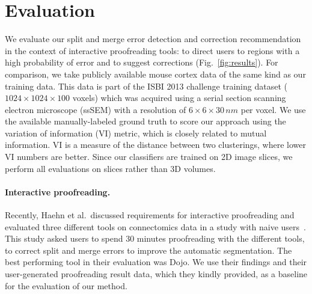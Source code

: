 \section{Evaluation}

We evaluate our split and merge error detection and correction recommendation in the context of interactive proofreading tools: to direct users to regions with a high probability of error and to suggest corrections (Fig.~\ref{fig:results}). For comparison, we take publicly available mouse cortex data of the same kind as our training data. This data is part of the ISBI 2013 challenge training dataset ($1024\times1024\times100$ voxels) which was acquired using a serial section scanning electron microscope (ssSEM) with a resolution of $6\times6\times30\, nm$ per voxel. We use the available manually-labeled ground truth to score our approach using the variation of information (VI) metric, which is closely related to mutual information. VI is a measure of the distance between two clusterings, where lower VI numbers are better. Since our classifiers are trained on 2D image slices, we perform all evaluations on slices rather than 3D volumes. 

\paragraph{Interactive proofreading.}
Recently, Haehn et al.~discussed requirements for interactive proofreading and evaluated three different tools on connectomics data in a study with naive users~\cite{haehn_dojo_2014}. This study asked users to spend 30 minutes proofreading with the different tools, to correct split and merge errors to improve the automatic segmentation. The best performing tool in their evaluation was Dojo. We use their findings and their user-generated proofreading result data, which they kindly provided, as a baseline for the evaluation of our method.

